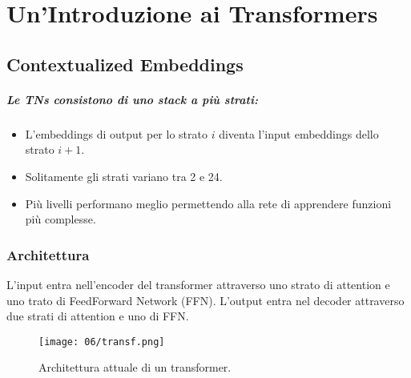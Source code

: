 \chapter{Un'Introduzione ai Transformers}

\section{Contextualized Embeddings}




\paragraph{Le TNs consistono di uno stack a più strati:}

\begin{itemize}
  \item L'embeddings di output per lo strato $i$ diventa l'input embeddings dello strato $i + 1$. 
  \item Solitamente gli strati variano tra 2 e 24. 
  \item Più livelli performano meglio permettendo alla rete di apprendere funzioni più complesse.
\end{itemize}

\subsection{Architettura}

L'input entra nell'encoder del transformer attraverso uno strato di attention e uno trato di FeedForward Network (FFN). L'output entra nel decoder  attraverso due strati di attention e uno di FFN.

\begin{figure}[h]
    \centering
    \texttt{[image: 06/transf.png]}
    \caption{Architettura attuale di un transformer.}
\end{figure}

